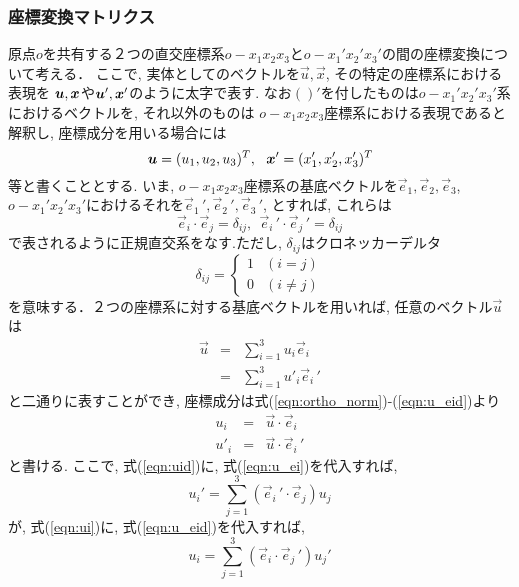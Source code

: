 \documentclass[10pt,a4j]{jarticle}
\begin{document}
\subsubsection{座標変換マトリクス}
原点$o$を共有する２つの直交座標系$o-x_1x_2x_3$と$o-x_1'x_2'x_3'$の間の座標変換について考える．
ここで, 実体としてのベクトルを$\vec{u},\vec{x}$, その特定の座標系における表現を
$\mbox{\boldmath $u$},\mbox{\boldmath $x$}$や$\mbox{\boldmath $u$}',\mbox{\boldmath $x$}'$のように太字で表す. 
なお$()'$を付したものは$o-x_1'x_2'x_3'$系におけるベクトルを, それ以外のものは
$o-x_1x_2x_3$座標系における表現であると解釈し, 座標成分を用いる場合には
\[
	\mbox{\boldmath $u$}=(u_1, u_2, u_3)^T, \ \ \mbox{\boldmath $x$}'=(x_1', x_2', x_3')^T
\]
等と書くこととする.
いま, $o-x_1x_2x_3$座標系の基底ベクトルを$\vec{e}_1, \vec{e}_2, \vec{e}_3$, 
$o-x_1'x_2'x_3'$におけるそれを$\vec{e}_1\,', \vec{e}_2\,', \vec{e}_3 \,'$, 
とすれば, これらは
\begin{equation}
	\vec{e}_i\cdot \vec{e}_j=\delta_{ij}, \ \ 
	\vec{e}_i\,' \cdot \vec{e}_j\,'=\delta_{ij}
	\label{eqn:ortho_norm}
\end{equation}
で表されるように正規直交系をなす.ただし, $\delta_{ij}$はクロネッカーデルタ
\begin{equation}
	\delta _{ij}=\left\{
	\begin{array}{cc}
		1 & (i=j) \\
		0 & (i\neq j)
	\end{array}
	\right.
	\label{eqn:dij}
\end{equation}
を意味する．２つの座標系に対する基底ベクトルを用いれば, 任意のベクトル$\vec{u}$は
\begin{eqnarray}
	\vec{u} &=& \sum_{i=1}^3 u_i\vec{e}_i 
	\label{eqn:u_ei}
	\\
	&=& \sum_{i=1}^3 u'_i\vec{e}_i\,' 
	\label{eqn:u_eid}
\end{eqnarray}
と二通りに表すことができ, 座標成分は式(\ref{eqn:ortho_norm})-(\ref{eqn:u_eid})より
\begin{eqnarray}
	u_i &=& \vec{u}\cdot \vec{e}_i \label{eqn:ui}\\
	u'_i&=& \vec{u}\cdot \vec{e}_i\,' \label{eqn:uid}
\end{eqnarray}
と書ける. ここで, 式(\ref{eqn:uid})に, 式(\ref{eqn:u_ei})を代入すれば, 
\begin{equation}
	u_i'=\sum_{j=1}^3 (\vec{e}_i\,'\cdot \vec{e}_j) u_j 
\end{equation}
が, 式(\ref{eqn:ui})に, 式(\ref{eqn:u_eid})を代入すれば, 
\begin{equation}
	u_i=\sum_{j=1}^3 (\vec{e}_i\cdot \vec{e}_j\, ') u_j' 
\end{equation}
\end{document}
